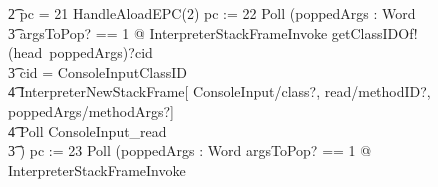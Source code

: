 \begin{figure}[tp!]
{\begin{circus}
    \t2 {} \circelse pc = 21 \circthen HandleAloadEPC(2) \circseq pc := 22 \circseq Poll \circseq (\circvar poppedArgs : \seq Word \circspot \\
    \t3 \lschexpract \exists argsToPop?  == 1 @ InterpreterStackFrameInvoke \rschexpract \circseq getClassIDOf!(head~poppedArgs)?cid \then {} \\
    \t3 \circif cid = ConsoleInputClassID \circthen {} \\
    \t4 \lschexpract InterpreterNewStackFrame[ ConsoleInput/class?, read/methodID?, poppedArgs/methodArgs?] \rschexpract \circseq \\
    \t4 Poll \circseq ConsoleInput\_read \\
    \t3 \circfi) \circseq pc := 23 \circseq Poll \circseq (\circvar poppedArgs : \seq Word \circspot \lschexpract \exists argsToPop? == 1 @ InterpreterStackFrameInvoke \rschexpract \circseq \\

\end{circus}}
\end{figure}

